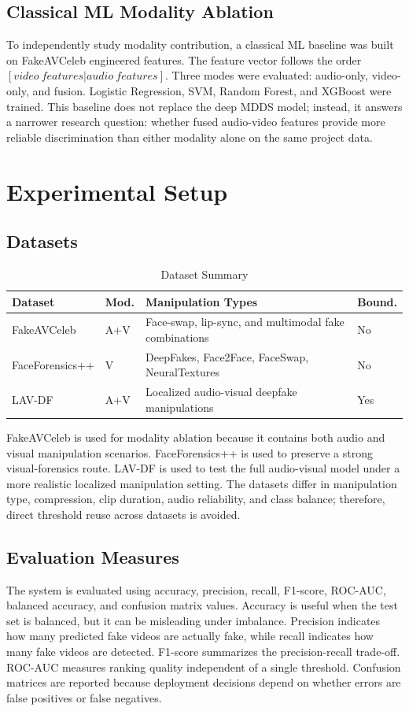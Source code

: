 \documentclass[conference]{IEEEtran}
\begin{document}
\subsection{Classical ML Modality Ablation}
To independently study modality contribution, a classical ML baseline was built on FakeAVCeleb engineered features. The feature vector follows the order $[video\ features | audio\ features]$. Three modes were evaluated: audio-only, video-only, and fusion. Logistic Regression, SVM, Random Forest, and XGBoost were trained. This baseline does not replace the deep MDDS model; instead, it answers a narrower research question: whether fused audio-video features provide more reliable discrimination than either modality alone on the same project data.

\section{Experimental Setup}
\subsection{Datasets}
\begin{table}[htbp]
\caption{Dataset Summary}
\centering
\begin{tabular}{p{1.55cm}p{1.15cm}p{2.6cm}p{0.85cm}}
\toprule
Dataset & Mod. & Manipulation Types & Bound. \\
\midrule
FakeAVCeleb & A+V & Face-swap, lip-sync, and multimodal fake combinations & No \\
FaceForensics++ & V & DeepFakes, Face2Face, FaceSwap, NeuralTextures & No \\
LAV-DF & A+V & Localized audio-visual deepfake manipulations & Yes \\
\bottomrule
\end{tabular}
\end{table}

FakeAVCeleb is used for modality ablation because it contains both audio and visual manipulation scenarios. FaceForensics++ is used to preserve a strong visual-forensics route. LAV-DF is used to test the full audio-visual model under a more realistic localized manipulation setting. The datasets differ in manipulation type, compression, clip duration, audio reliability, and class balance; therefore, direct threshold reuse across datasets is avoided.

\subsection{Evaluation Measures}
The system is evaluated using accuracy, precision, recall, F1-score, ROC-AUC, balanced accuracy, and confusion matrix values. Accuracy is useful when the test set is balanced, but it can be misleading under imbalance. Precision indicates how many predicted fake videos are actually fake, while recall indicates how many fake videos are detected. F1-score summarizes the precision-recall trade-off. ROC-AUC measures ranking quality independent of a single threshold. Confusion matrices are reported because deployment decisions depend on whether errors are false positives or false negatives.
\end{document}
